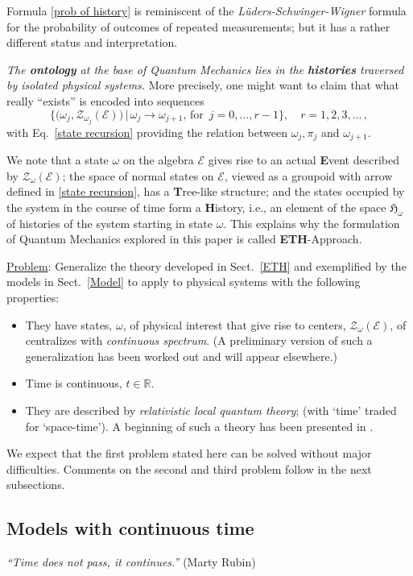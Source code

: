 \documentclass[a4paper,11pt]{article}
\begin{document}
{Formula \eqref{prob of history} is reminiscent of the \textit{L\"uders-Schwinger-Wigner} formula \cite{LSW} for the probability of outcomes of repeated measurements; but it has a rather different status and interpretation.

\textit{The {\bf{ontology}} at the base of Quantum Mechanics lies in the {\bf{histories}} traversed by isolated physical systems.} More precisely, one might want to claim that what really ``exists'' is encoded into sequences
$$\Big\{ \Big(\omega_j, \mathcal{Z}_{\omega_j}(\mathcal{E}) \Big) \,\Big| \, \omega_j \rightarrow \omega_{j+1},\,\text{for }\, j=0, \dots, r-1\Big\}, \quad r=1,2,3,\dots\,,$$
with Eq.~\eqref{state recursion} providing the relation between $\omega_j, \pi_j$ and $\omega_{j+1}$.

We note that a state $\omega$ on the algebra $\mathcal{E}$ gives rise to an actual {\bf{E}}vent described by 
$\mathcal{Z}_{\omega}(\mathcal{E})$; the space of normal states on $\mathcal{E}$, viewed as a groupoid with arrow 
defined in \eqref{state recursion}, has a {\bf{T}}ree-like structure; and the states occupied by the system in the course of 
time form a {\bf{H}}istory, i.e., an element of the space $\mathfrak{H}_{\omega}$ of histories of the system starting in 
state $\omega$. This explains why the formulation of Quantum Mechanics explored in this paper is called 
{\bf{ETH}}-Approach. 

\underline{Problem}: Generalize the theory developed in Sect.~\ref{ETH} and exemplified by the models in Sect.~\ref{Model} to apply to physical systems with the following properties:
\begin{itemize}
\item{They have states, $\omega$, of physical interest that give rise to centers, $\mathcal{Z}_{\omega}(\mathcal{E})$, of centralizes with \textit{continuous spectrum}. (A preliminary version of such a generalization has been worked out and will appear elsewhere.)}
\item{Time is continuous, $t\in \mathbb{R}$.}
\item{They are described by \textit{relativistic local quantum theory}; (with `time' traded for `space-time'). A beginning of such a theory has been presented in \cite{Fr2}.}
\end{itemize}
We expect that the first problem stated here can be solved without major difficulties. Comments on the second and third problem follow in the next subsections.

\subsection{Models with continuous time}
\hspace{0.5cm}\textit{``Time does not pass, it continues.''} (Marty Rubin)


}
\end{document}
